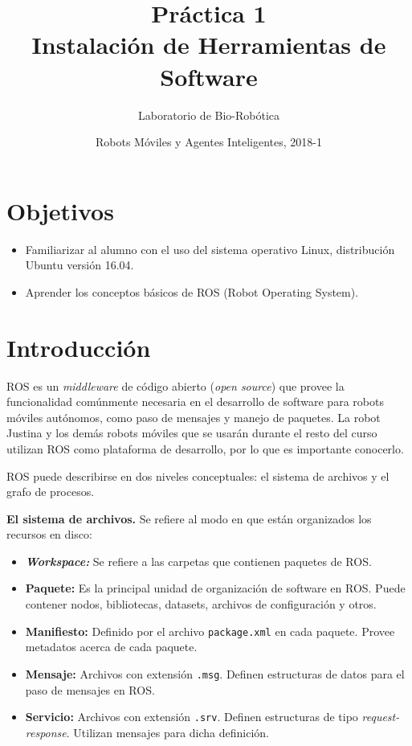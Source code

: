 \documentclass[letterpaper,12pt]{article}
\title{Práctica 1 \\ Instalación de Herramientas de Software}
\author{Laboratorio de Bio-Robótica}
\date{Robots Móviles y Agentes Inteligentes, 2018-1}
\begin{document}
\renewcommand{\tablename}{Tabla}
\maketitle
\section*{Objetivos}
\begin{itemize}
\item Familiarizar al alumno con el uso del sistema operativo Linux, distribución Ubuntu versión 16.04.
\item Aprender los conceptos básicos de ROS (Robot Operating System).
\end{itemize}

\section{Introducción}
ROS es un \textit{middleware} de código abierto (\textit{open source}) que provee la funcionalidad comúnmente necesaria en el desarrollo de software para robots móviles autónomos, como paso de mensajes y manejo de paquetes. La robot Justina y los demás robots móviles que se usarán durante el resto del curso utilizan ROS como plataforma de desarrollo, por lo que es importante conocerlo.

ROS puede describirse en dos niveles conceptuales: el sistema de archivos y el grafo de procesos.

\textbf{El sistema de archivos.} Se refiere al modo en que están organizados los recursos en disco:
\begin{itemize}
\item \textbf{\textit{Workspace:}} Se refiere a las carpetas que contienen paquetes de ROS.
\item \textbf{Paquete:} Es la principal unidad de organización de software en ROS. Puede contener nodos, bibliotecas, datasets, archivos de configuración y otros.
\item \textbf{Manifiesto:} Definido por el archivo \texttt{package.xml} en cada paquete. Provee metadatos acerca de cada paquete. 
\item \textbf{Mensaje:} Archivos con extensión \texttt{.msg}. Definen estructuras de datos para el paso de mensajes en ROS.
\item \textbf{Servicio:} Archivos con extensión \texttt{.srv}. Definen estructuras de tipo \textit{request-response}. Utilizan mensajes para dicha definición.
\end{itemize}
\end{document}
